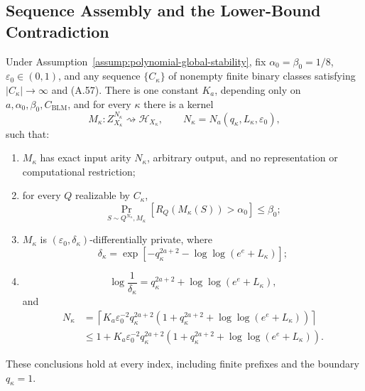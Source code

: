 \subsection{Sequence Assembly and the Lower-Bound Contradiction}
\label{app:sequence-assembly}

\begin{proposition}
\label{prop:step-006-sequence-learners}
Under Assumption~\ref{assump:polynomial-global-stability}, fix
\(\alpha_0=\beta_0=1/8\), \(\varepsilon_0\in(0,1)\), and any sequence
\(\{C_\kappa\}\) of nonempty finite binary classes satisfying
\(|C_\kappa|\to\infty\) and (A.57).  There is one constant \(K_a\),
depending only on \(a,\alpha_0,\beta_0,C_{\mathrm{BLM}}\), and for
every \(\kappa\) there is a kernel
\[
M_\kappa:
Z_{X_\kappa}^{N_\kappa}
\rightsquigarrow\mathcal H_{X_\kappa},
\qquad
N_\kappa=N_a(q_\kappa,L_\kappa,\varepsilon_0),
\tag{A.111}
\]
such that:
\begin{enumerate}[label=(\roman*)]
\item \(M_\kappa\) has exact input arity \(N_\kappa\), arbitrary
output, and no representation or computational restriction;
\item for every \(Q\) realizable by \(C_\kappa\),
\[
\Pr_{S\sim Q^{N_\kappa},M_\kappa}
[R_Q(M_\kappa(S))>\alpha_0]\leq\beta_0;
\tag{A.112}
\]
\item \(M_\kappa\) is
\((\varepsilon_0,\delta_\kappa)\)-differentially private, where
\[
\delta_\kappa
=\exp[-q_\kappa^{2a+2}
-\log\log(e^e+L_\kappa)];
\tag{A.113}
\]
\item
\[
\log\frac1{\delta_\kappa}
=q_\kappa^{2a+2}+\log\log(e^e+L_\kappa),
\tag{A.114}
\]
and
\[
\begin{aligned}
N_\kappa
&=
\left\lceil
K_a\varepsilon_0^{-2}q_\kappa^{2a+2}
\left(
1+q_\kappa^{2a+2}
+\log\log(e^e+L_\kappa)
\right)
\right\rceil\\
&\leq
1+K_a\varepsilon_0^{-2}q_\kappa^{2a+2}
\left(
1+q_\kappa^{2a+2}
+\log\log(e^e+L_\kappa)
\right).
\end{aligned}
\tag{A.115}
\]
\end{enumerate}
These conclusions hold at every index, including finite prefixes and
the boundary \(q_\kappa=1\).
\end{proposition}

